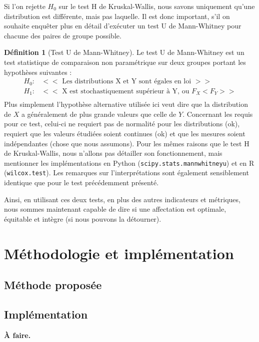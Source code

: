 \documentclass{rapport}
\theoremstyle{definition}
\newtheorem{definition}{Définition}
\theoremstyle{remark}
\theoremstyle{plain}
\theoremstyle{definition}
\theoremstyle{remark}
\begin{document}
Si l'on rejette $H_0$ sur le test H de Kruskal-Wallis, nous savons uniquement qu'une distribution est différente, mais pas laquelle. Il est donc important, s'il on souhaite enquêter plus en détail d'exécuter un test U de Mann-Whitney pour chacune des paires de groupe possible.
\begin{definition}[Test U de Mann-Whitney]
    Le test U de Mann-Whitney est un test statistique de comparaison non paramétrique sur deux groupes portant les hypothèses suivantes :
    $$
    \begin{matrix}
        H_0 : & << \text{ Les distributions X et Y sont égales en loi } >>\\
        H_1 : & << \text{ X est stochastiquement supérieur à Y, ou } F_X<F_Y >>\\
    \end{matrix}
    $$
    Plus simplement l'hypothèse alternative utilisée ici veut dire que la distribution de $X$ a généralement de plus grande valeurs que celle de $Y$. 
    Concernant les requis pour ce test, celui-ci ne requiert pas de normalité pour les distributions (ok), requiert que les valeurs étudiées soient continues (ok) et que les mesures soient indépendantes (chose que nous assumons).
    Pour les mêmes raisons que le test H de Kruskal-Wallis, nous n'allons pas détailler son fonctionnement, mais mentionner les implémentations en Python (\texttt{scipy.stats.mannwhitneyu}) et en R (\texttt{wilcox.test}). 
    Les remarques sur l'interprétations sont également sensiblement identique que pour le test précédemment présenté. 
\end{definition}

Ainsi, en utilisant ces deux tests, en plus des autres indicateurs et métriques, nous sommes maintenant capable de dire si une affectation est optimale, équitable et intègre (si nous pouvons la détourner). 

\section{Méthodologie et implémentation}
\subsection{Méthode proposée}




\subsection{Implémentation}
\textbf{À faire.}
\end{document}
